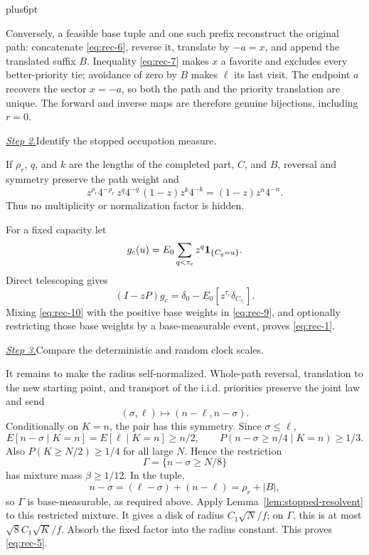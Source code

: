 \documentclass[12pt,reqno]{amsart}
\makeatletter
\theoremstyle{plain}
\theoremstyle{definition}
\theoremstyle{remark}
\renewenvironment{proof}[1][\proofname]{%
  \par
  \pushQED{\qed}%
  \normalfont
  \topsep6pt plus6pt\relax
  \trivlist
  \item[\hskip\labelsep\slshape #1\@addpunct{.}]%
  \ignorespaces
}{%
  \popQED
  \endtrivlist
  \@endpefalse
}
\DeclareRobustCommand{\qed}{%
  \leavevmode\unskip\penalty9999\hbox{}\nobreak
  \ifmmode
    \makebox[0pt][l]{\qquad\hbox{\qedsymbol}}%
  \else
    \qquad\hbox{\qedsymbol}%
  \fi
}
\renewcommand{\qedsymbol}{\rule[.47pt]{4pt}{6pt}}
\numberwithin{equation}{section}
\makeatother
\begin{document}
\begin{proof}
Conversely, a feasible base tuple and one such prefix reconstruct the
original path: concatenate \eqref{eq:rec-6}, reverse it, translate by
\(-a=x\), and append the translated suffix \(B\).  Inequality \eqref{eq:rec-7} makes
\(x\) a favorite and excludes every better-priority tie; avoidance of zero
by \(B\) makes \(\ell\) its last visit.  The endpoint \(a\) recovers the
sector \(x=-a\), so both the path and the priority translation are unique.
The forward and inverse maps are therefore genuine bijections, including
\(r=0\).

\smallskip\noindent\underline{\textit{Step 2.}}\quad Identify the stopped occupation measure.

If \(\rho_r\), \(q\), and \(k\) are the lengths of the completed part,
\(C\), and \(B\), reversal and symmetry preserve the path weight and
\begin{equation}
z^{\rho_r}4^{-\rho_r}\,
 z^q4^{-q}\,(1-z)z^k4^{-k}
       =(1-z)z^n4^{-n}.                                      \label{eq:rec-9}
\end{equation}
Thus no multiplicity or normalization factor is hidden.

For a fixed capacity let
\[
       g_c(u)=E_0\sum_{q<\tau_c}z^q{\bf1}_{\{C_q=u\}}.
\]
Direct telescoping gives
\begin{equation}
(I-zP)g_c=\delta_0-E_0[z^{\tau_c}\delta_{C_{\tau_c}}].  \label{eq:rec-10}
\end{equation}
Mixing \eqref{eq:rec-10} with the positive base weights in \eqref{eq:rec-9}, and optionally
restricting those base weights by a base-measurable event, proves \eqref{eq:rec-1}.

\smallskip\noindent\underline{\textit{Step 3.}}\quad Compare the deterministic and random clock scales.

It remains to make the radius self-normalized.  Whole-path reversal,
translation to the new starting point, and transport of the i.i.d. priorities
preserve the joint law and send
\[
       (\sigma,\ell)\longmapsto(n-\ell,n-\sigma).
\]
Conditionally on $K=n$, the pair has this symmetry. Since $\sigma\le\ell$,
\begin{equation}
E[n-\sigma\mid K=n]=E[\ell\mid K=n]\ge n/2,
       \qquad P(n-\sigma\ge n/4\mid K=n)\ge1/3.                        \label{eq:rec-11}
\end{equation}
Also \(P(K\ge N/2)\ge1/4\) for all large \(N\).  Hence the restriction
\[
       \Gamma=\{n-\sigma\ge N/8\}
\]
has mixture mass \(\beta\ge1/12\).  In the tuple,
\[
       n-\sigma=(\ell-\sigma)+(n-\ell)=\rho_r+|B|,
\]
so \(\Gamma\) is base-measurable, as required above.  Apply Lemma~\ref{lem:stopped-resolvent} to this restricted mixture. It gives a disk of radius $C_1\sqrt N/f$; on $\Gamma$, this is at most $\sqrt8 C_1\sqrt K/f$. Absorb the fixed factor into the radius constant.  This proves \eqref{eq:rec-5}.
\end{proof}
\end{document}
